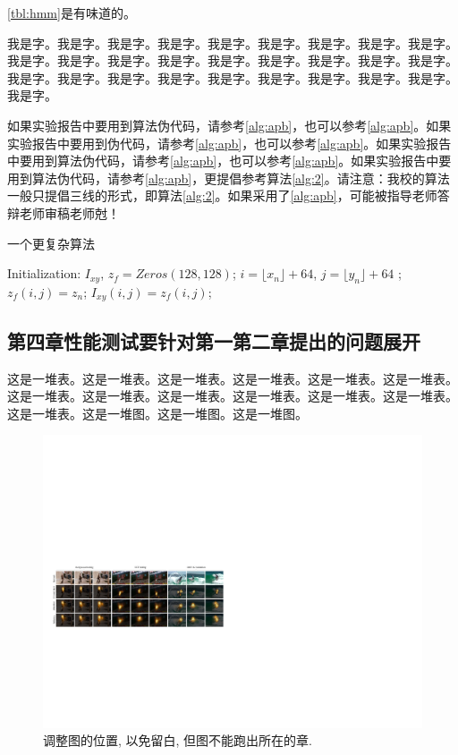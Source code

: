 \documentclass[supercite]{HustGraduPaper}
\newcommand{\ralg}[1]{\autoref{alg:#1}}
\newcommand{\rtbl}[1]{\autoref{tbl:#1}}
\theoremstyle{definition}
\begin{document}
\rtbl{hmm}是有味道的。

我是字。我是字。我是字。我是字。我是字。我是字。我是字。我是字。我是字。我是字。我是字。我是字。我是字。我是字。我是字。我是字。我是字。我是字。我是字。我是字。我是字。我是字。我是字。我是字。我是字。我是字。我是字。我是字。

如果实验报告中要用到算法伪代码，请参考\ralg{apb}，也可以参考\ralg{apb}。如果实验报告中要用到伪代码，请参考\ralg{apb}，也可以参考\ralg{apb}。如果实验报告中要用到算法伪代码，请参考\ralg{apb}，也可以参考\ralg{apb}。如果实验报告中要用到算法伪代码，请参考\ralg{apb}，更提倡参考算法\ref{alg:2}。请注意：我校的算法一般只提倡三线的形式，即算法\ref{alg:2}。如果采用了\ralg{apb}，可能被指导老师答辩老师审稿老师尅！

\begin{algorithm}[h] 
	\caption{一个更复杂算法}
	\begin{algorithmic}[1]
		\State Initialization: $I_{xy}$, $z_{f}=Zeros(128, 128)$; 
		\State $i=\lfloor x_n \rfloor+64$, $j=\lfloor y_n \rfloor + 64$
		;
		\State $z_{f}(i,j)=z_n$;
		\EndIf
		\State $I_{xy}(i,j)=z_{f}(i,j)$;
		\EndFor 
	\end{algorithmic}\label{alg:2}
\end{algorithm}

\subsection{第四章性能测试要针对第一第二章提出的问题展开}

这是一堆\cite{Dai2008Semantic}表。这是一堆表。这是一堆表。这是一堆表。这是一堆表。这是一堆表。这是一堆表。这是一堆表。这是一堆表。这是一堆表。这是一堆表。这是一堆表。这是一堆表。这是一堆图。这是一堆图。这是一堆图。

\begin{figure}[htb]
	\setlength{\abovecaptionskip}{ 0.0cm}
	\setlength{\belowcaptionskip}{-0.5cm}
	\begin{center}
		\includegraphics[scale=0.25]{Fig2-1.pdf}
		\caption{调整图的位置, 以免留白, 但图不能跑出所在的章.}
		\label{fig2-1}
	\end{center}
\end{figure}
\end{document}
